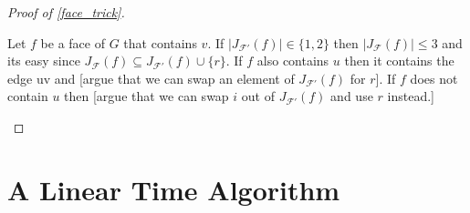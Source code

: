 \documentclass{patmorin}
\begin{document}
\begin{proof}[Proof of \cref{face_trick}]
\begin{enumerate}
    Let $f$ be a face of $G$ that contains $v$.  If $|J_{\mathcal{F}'}(f)|\in\{1,2\}$ then $|J_{\mathcal{F}}(f)|\le 3$ and its easy since $J_{\mathcal{F}}(f)\subseteq J_{\mathcal{F'}}(f)\cup\{r\}$.  If $f$ also contains $u$ then it contains the edge uv and [argue that we can swap an element of $J_{\mathcal{F}'}(f)$ for $r$].  If $f$ does not contain $u$ then [argue that we can swap $i$ out of $J_{\mathcal{F}'}(f)$ and use $r$ instead.]  \qedhere
  \end{enumerate}
\end{proof}


\section{A Linear Time Algorithm}




\end{document}
